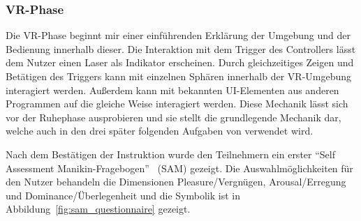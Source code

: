 \subsubsection{VR-Phase}

Die VR-Phase beginnt mir einer einführenden Erklärung der Umgebung und der Bedienung innerhalb dieser. Die Interaktion mit dem Trigger des Controllers lässt dem Nutzer einen Laser als Indikator erscheinen. 
Durch gleichzeitiges Zeigen und Betätigen des Triggers kann mit einzelnen Sphären innerhalb der VR-Umgebung interagiert werden.
Außerdem kann mit bekannten UI-Elementen aus anderen Programmen auf die gleiche Weise interagiert werden.
Diese Mechanik lässt sich vor der Ruhephase ausprobieren und sie stellt die grundlegende Mechanik dar, welche auch in den drei später folgenden Aufgaben von verwendet wird.

Nach dem Bestätigen der Instruktion wurde den Teilnehmern ein erster "`Self Assessment Manikin-Fragebogen"'~\cite{bradley1994measuring} (SAM) gezeigt. Die Auswahlmöglichkeiten für den Nutzer behandeln die Dimensionen Pleasure/Vergnügen, Arousal/Erregung und Dominance/Überlegenheit und die Symbolik ist in Abbildung~\ref{fig:sam_questionnaire} gezeigt.

